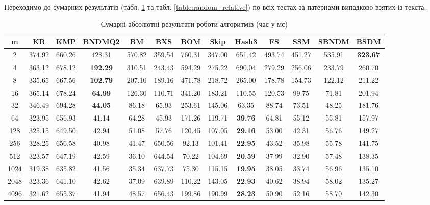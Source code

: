 \documentclass[a4paper,14pt]{extarticle} %
\begin{document}
				Переходимо до сумарних результатів (табл. \ref{table:random_absolute} та табл. \ref{table:random_relative}) по всіх тестах за патернами випадково взятих із текста.
			
				\begin{table}[H]
					\centering
					\scriptsize
					\begin{tabular}{|c|c|c|c|c|c|c|c|c|c|c|c|c|}
					\hline
					\textbf{m} & \textbf{KR} & \textbf{KMP} & \textbf{BNDMQ2} & \textbf{BM} & \textbf{BXS} & \textbf{BOM} & \textbf{Skip} & \textbf{Hash3} & \textbf{FS} & \textbf{SSM} & \textbf{SBNDM} & \textbf{BSDM} \\
					\hline
					2 & 374.92 & 660.26 & 428.31 & 570.82 & 359.54 & 760.31 & 347.00 & 651.42 & 493.74 & 451.27 & 535.91 & \textbf{323.67} \\
					\hline
					4 & 363.12 & 678.12 & \textbf{192.29} & 310.51 & 243.43 & 594.29 & 275.22 & 690.04 & 279.29 & 256.06 & 233.79 & 260.70 \\
					\hline
					8 & 335.65 & 667.56 & \textbf{102.79} & 207.10 & 189.16 & 471.78 & 218.72 & 265.00 & 178.78 & 154.73 & 122.12 & 211.22 \\
					\hline
					16 & 365.14 & 678.24 & \textbf{64.99} & 126.30 & 110.71 & 341.20 & 183.21 & 110.55 & 120.53 & 99.75 & 71.81 & 201.94 \\
					\hline
					32 & 346.49 & 694.28 & \textbf{44.05} & 86.18 & 65.93 & 253.61 & 145.06 & 63.35 & 88.74 & 73.51 & 48.25 & 181.76 \\
					\hline
					64 & 323.95 & 656.93 & 41.14 & 64.28 & 45.93 & 171.26 & 119.71 & \textbf{39.76} & 64.81 & 55.12 & 55.81 & 157.97 \\
					\hline
					128 & 325.15 & 649.50 & 42.94 & 51.08 & 57.76 & 120.45 & 107.05 & \textbf{29.16} & 53.00 & 42.31 & 56.76 & 149.27 \\
					\hline
					256 & 328.25 & 656.58 & 40.98 & 41.47 & 650.56 & 92.13 & 101.41 & \textbf{22.95} & 43.52 & 35.98 & 55.78 & 141.75 \\
					\hline
					512 & 323.57 & 647.19 & 42.59 & 36.10 & 644.54 & 70.22 & 104.69 & \textbf{20.59} & 37.99 & 32.90 & 57.48 & 138.35 \\
					\hline
					1024 & 319.38 & 635.82 & 41.56 & 35.34 & 637.73 & 75.30 & 115.15 & \textbf{19.95} & 38.05 & 33.74 & 56.96 & 135.10 \\
					\hline
					2048 & 323.36 & 641.10 & 42.62 & 37.09 & 639.89 & 110.22 & 143.05 & \textbf{22.93} & 40.62 & 38.94 & 58.02 & 135.27 \\
					\hline
					4096 & 321.62 & 655.37 & 41.94 & 48.57 & 656.43 & 199.86 & 190.99 & \textbf{28.23} & 50.90 & 52.16 & 58.70 & 142.30 \\
					\hline
					\end{tabular}
					\caption{Сумарні абсолютні результати роботи алгоритмів (час у мс)}
					\label{table:random_absolute}
					\end{table}
				
\end{document}
